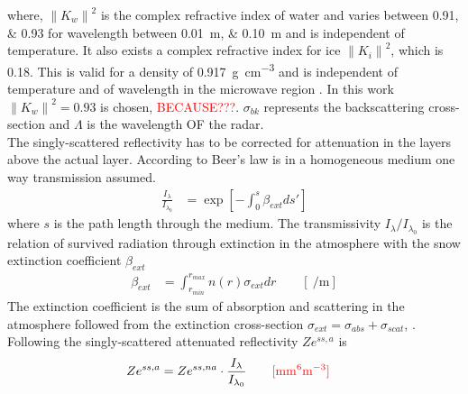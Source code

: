 where, $\left\| K_w \right\|^2$ is the complex refractive index of water and varies between \numlist{0.91;0.93} for wavelength between \SIlist{0.01;0.10}{\metre} and is independent of temperature. It also exists a  complex refractive index for ice $\left\| K_i \right\|^2$, which is \SI{0.18}{}. This is valid for a density of \SI{0.917}{\gram\per\cubic\cm} and is independent of temperature and of wavelength in the microwave region \citep{doviak_doppler_1993}. In this work  $\left\| K_w \right\|^2 = 0.93$ is chosen, \textcolor{red}{BECAUSE???}. $\sigma_{bk}$ represents the backscattering cross-section and $\Lambda$ is the wavelength OF the radar. 
\\
The singly-scattered reflectivity has to be corrected for attenuation in the layers above the actual layer. According to Beer's law is in a homogeneous medium one way transmission assumed. 
\begin{align}
	\frac{I_{\lambda}}{I_{\lambda_0}} & = \exp \left[ - \int_0^s \beta_{ext} ds'\right] \label{eq:Beer}
\end{align}
where $s$ is the path length through the medium. The transmissivity $I_{\lambda}/I_{\lambda_0}$ is the relation of survived radiation through extinction in the atmosphere with the snow extinction coefficient $\beta_{ext}$
\begin{align}
	\beta_{ext} & = \int_{r_{min}}^{r_{max}} n(r) \sigma_{ext} dr \qquad [\SI{}{\per\metre}] \label{eq:bext}
\end{align}
The extinction coefficient is the sum of absorption and scattering in the atmosphere followed from the extinction cross-section $\sigma_{ext} = \sigma_{abs} + \sigma_{scat}$, \citep{lohmann_introduction_2016,lamb_physics_2011}. \textcolor{red}{\cite[Eq. 12.1 and more][]{lohmann_introduction_2016}} \\
Following  the singly-scattered attenuated reflectivity $Ze^{ss, a}$ is
\begin{align}
	Ze^{ss, a} & = Ze^{ss, na} \cdot \frac{I_{\lambda}}{I_{\lambda_0}} \qquad \textcolor{red}{[\SI{}{\mm^6\metre^{-3}}]} \label{eq:sing_scatt_att_Z}
\end{align}
